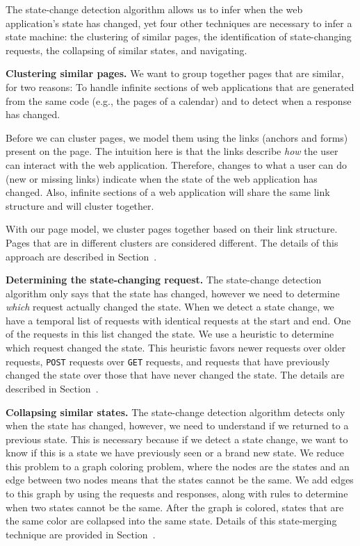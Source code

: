 The state-change detection algorithm allows us to infer when the web
application's state has changed, yet four other techniques
are necessary to infer a state machine: the clustering of
similar pages, the identification of state-changing requests, the collapsing of
similar states, and navigating.

\noindent \textbf{Clustering similar pages.}
We want to group together pages that are similar, for two reasons: To handle
infinite sections of web applications that are generated from the same
code (e.g., the pages of a calendar) and to detect when a response has changed.

Before we can cluster pages, we model them using the links (anchors and forms) present on
the page. The intuition here is that the links describe \emph{how}
the user can interact with the web application. Therefore, changes to what a
user can do (new or missing links) indicate when the state of the web
application has changed. Also, infinite sections of a web application will
share the same link structure and will cluster together. 

With our page model, we cluster pages together based on their link structure.
Pages that are in different clusters are considered different. The details of
this approach are described in Section~.

\noindent \textbf{Determining the state-changing request.}
The state-change detection algorithm only says that the state has changed, however we
need to determine \emph{which} request actually changed the state. When we
detect a state change, we have a temporal list of requests with
identical requests at the start and end. One of the requests in this list
changed the state. We use a heuristic to determine which request changed the
state. This heuristic favors newer requests over older requests, \texttt{POST}
requests over \texttt{GET} requests, and requests that have previously changed
the state over those that have never changed the state. The details are
described in Section~.

\noindent \textbf{Collapsing similar states.}
The state-change detection algorithm detects only when the state has changed, however, we
need to understand if we returned to a previous state. This is necessary
because if we detect a state change, we want to know if this is a state we
have previously seen or a brand new state. We reduce this problem to a graph coloring problem, where the
nodes are the states and an edge between two nodes means that the states cannot
be the same. We add edges to this graph by using the requests and responses,
along with rules to determine when two states cannot be the same. After the
graph is colored, states that are the same color are collapsed into the same
state. Details of this state-merging technique are provided in Section~.

